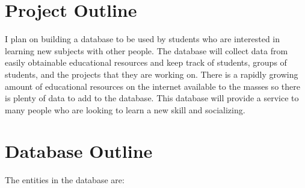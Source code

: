 \documentclass[12pt]{article}
\begin{document}
\maketitle


\section{Project Outline}
I plan on building a database to be used by students who are interested in learning new subjects with other people. The database will collect data from easily obtainable educational resources and keep track of students, groups of students, and the projects that they are working on. There is a rapidly growing amount of educational resources on the internet available to the masses so there is plenty of data to add to the database. This database will provide a service to many people who are looking to learn a new skill and socializing.

\section{Database Outline}

The entities in the database are:
\end{document}
